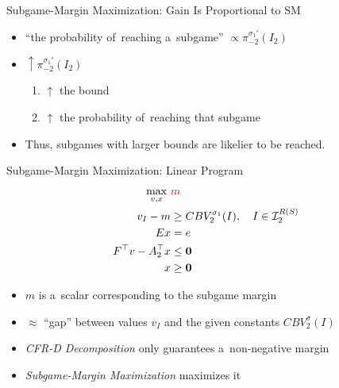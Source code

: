 \documentclass{beamer}
\theoremstyle{definition}
\newcommand{\vect}[1]{\boldsymbol{#1}}
\newcommand{\I}{\mathcal{I}}
\begin{document}
{\begin{frame}{Subgame-Margin Maximization: Gain Is Proportional to SM}
      \begin{itemize}[<+- | alert@+>]
         \item ``the probability of~reaching a~subgame'' $\propto \pi_{-2}^{\sigma_1'}(I_2)$
         \item $\uparrow \pi_{-2}^{\sigma_1'}(I_2)$
           \begin{enumerate}[$\Rightarrow$]
             \item $\uparrow$ the bound
             \item $\uparrow$ the probability of~reaching that subgame
           \end{enumerate}
         \item Thus, subgames with larger bounds are likelier to be reached.
      \end{itemize}
    \end{frame}

    \begin{frame}{Subgame-Margin Maximization: Linear Program}
      \begin{equation*}
        \label{lp:max-margin}
        \begin{split}
          \max_{v, x}\ &\textcolor{red}{m} \\
          v_I - m &\ge CBV_2^{\sigma_1}(I), \quad I \in \I_2^{R(S)}\\ 
          Ex &= e \\
          F^\top v - A_2^\top x &\le \vect{0} \\
          x &\ge \vect{0}
        \end{split}
      \end{equation*}
      \pause

      \begin{itemize}[<+- | alert@+>]
        \item $m$ is a~scalar corresponding to the subgame margin
        \item $\approx$ ``gap'' between values $v_I$ and the given constants $CBV_2^\sigma(I)$
        \item \emph{CFR-D Decomposition} only guarantees a~non-negative margin
        \item \emph{Subgame-Margin Maximization} maximizes it
      \end{itemize}
    \end{frame}

}
\end{document}
